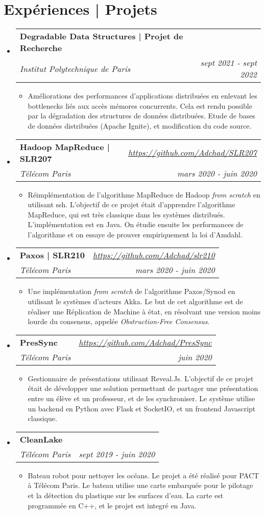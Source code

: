 \documentclass[a4paper,20pt]{article}
\makeatletter
\newcommand{\resumeItemWithoutTitle}[1]{
  \item\small{
    {\vspace{-2pt}#1}
  }
}
\newcommand{\resumeSubheading}[4]{
  \vspace{-1pt}\item
    \begin{tabular*}{0.97\textwidth}{l@{\extracolsep{\fill}}r}
      \textbf{#1} & #2 \\
      \textit{#3} & \textit{#4} \\
    \end{tabular*}\vspace{-5pt}
}
\newcommand{\resumeSubHeadingListStart}{\begin{itemize}[leftmargin=*]}
\newcommand{\resumeSubHeadingListEnd}{\end{itemize}}
\newcommand{\resumeItemListStart}{\begin{itemize}}
\newcommand{\resumeItemListEnd}{\end{itemize}\vspace{-5pt}}
\makeatother
\begin{document}
\section{Expériences | Projets}
 \resumeSubHeadingListStart
  \resumeSubheading
  {Degradable Data Structures | Projet de Recherche}{ }
  {Institut Polytechnique de Paris}{sept 2021 - sept 2022}
   \resumeItemListStart 
    \resumeItemWithoutTitle
    {Améliorations des performances d'applications distribuées en enlevant les bottlenecks liés aux accès mémores concurrents. Cela est rendu possible par la dégradation des structures de données distribuées. Etude de bases de données distribuées (Apache Ignite), et modification du code source. }
   \resumeItemListEnd 
  \resumeSubheading
  {Hadoop MapReduce | SLR207}{\textit{\href{https://github.com/Adchad/SLR207}{https://github.com/Adchad/SLR207}}}
  {Télécom Paris}{mars 2020 - juin 2020 }
   \resumeItemListStart 
    \resumeItemWithoutTitle
    {Réimplémentation de l'algorithme MapReduce de Hadoop \textit{from scratch} en utilisant ssh. L'objectif de ce projet était d'apprendre l'algorithme MapReduce, qui est très classique dans les systèmes distribués. L'implémentation est en Java. On étudie ensuite les performances de l'algorithme et on essaye de prouver empiriquement la loi d'Amdahl.}
   \resumeItemListEnd 
  \resumeSubheading
  {Paxos | SLR210}{\textit{\href{https://github.com/Adchad/slr210}{https://github.com/Adchad/slr210}}}
  {Télécom Paris}{mars 2020 - juin 2020 }
   \resumeItemListStart 
    \resumeItemWithoutTitle
    {Une implémentation \textit{from scratch} de l'algorithme Paxos/Synod en utilisant le systèmes d'acteurs Akka. Le but de cet algorithme est de réaliser une Réplication de Machine à état, en résolvant une version moins lourde du consensus, appelée \textit{Obstruction-Free Consensus}.}
   \resumeItemListEnd 
  \resumeSubheading
  {PresSync}{\textit{\href{https://github.com/Adchad/PresSync}{https://github.com/Adchad/PresSync}}}
  {Télécom Paris}{juin 2020}
   \resumeItemListStart 
    \resumeItemWithoutTitle
    {Gestionnaire de présentations utilisant Reveal.Js. L'objectif de ce projet était de développer une solution permettant de partager une présentation entre un élève et un professeur, et de les synchroniser. Le système utilise un backend en Python avec Flask et SocketIO, et un frontend Javascript classique.}
   \resumeItemListEnd 
  \resumeSubheading
  {CleanLake}{ }
  {Télécom Paris}{sept 2019 - juin 2020}
   \resumeItemListStart 
    \resumeItemWithoutTitle
    {Bateau robot pour nettoyer les océans. Le projet a été réalisé pour PACT à Télécom Paris. Le bateau utilise une carte embarquée pour le pilotage et la détection du plastique sur les surfaces d'eau. La carte est programmée en C++, et le projet est integré en Java.}
   \resumeItemListEnd 
 \resumeSubHeadingListEnd
\end{document}
